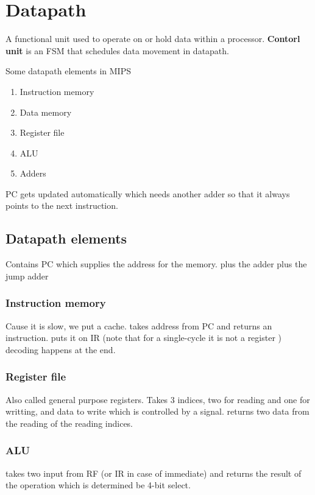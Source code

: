 \chapter{Datapath}
\begin{definition}[Datapath]
    A functional unit used to operate on or hold data within a processor. \textbf{Contorl unit} is an FSM that schedules data movement in datapath.
\end{definition}

\begin{example}
    Some datapath elements in MIPS
    \begin{enumerate}
        \item Instruction memory
        \item Data memory
        \item Register file
        \item ALU
        \item Adders
    \end{enumerate}
\end{example}

PC gets updated automatically which needs another adder so that it always points to the next instruction.
\section{Datapath elements}
Contains PC which supplies the address for the memory. plus the adder plus the jump adder

\subsection{Instruction memory}
Cause it is slow, we put a cache. takes address from PC and returns an instruction. puts it on IR (note that for a single-cycle it is not a register )
decoding happens at the end.

\subsection{Register file}
Also called general purpose registers. Takes 3 indices, two for reading and one for writting, and data to write which is controlled by a signal. returns two data from the reading of the reading indices.

\subsection{ALU}
takes two input from RF (or IR in case of immediate) and returns the result of the operation which is determined be 4-bit select.


